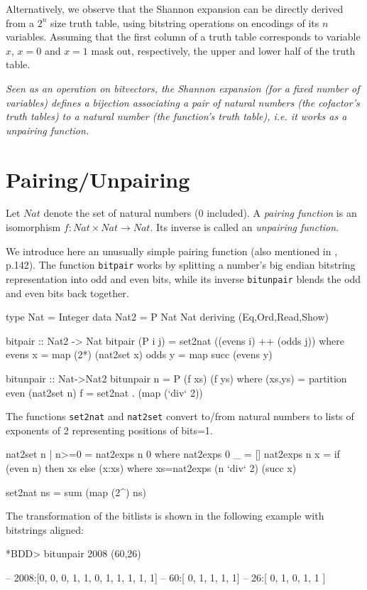 \documentclass[]{INCLUDES/llncs}
\begin{document}
Alternatively, we observe that the Shannon expansion
can be directly derived from a $2^n$ size truth table, 
using bitstring operations on encodings of its $n$ variables.
Assuming that the first column of a truth table corresponds to 
variable $x$, $x=0$ and $x=1$ mask out, respectively, 
the upper and lower half of the truth table.

{\em Seen as an operation on bitvectors, the Shannon expansion 
(for a fixed number of variables) defines a bijection associating 
a pair of natural numbers (the cofactor's truth tables) 
to a natural number (the function's truth table), 
i.e. it works as a {\em unpairing function}.}

\section{Pairing/Unpairing} \label{pairings}

Let $Nat$ denote the set of natural numbers (0 included). A {\em pairing
function} is an isomorphism $f:Nat \times Nat \rightarrow Nat$. 
Its inverse is called an {\em unpairing function}.

We introduce here an unusually simple pairing function 
(also mentioned in \cite{pigeon}, p.142).
The function {\tt bitpair} works by splitting a 
number's big endian bitstring
representation into odd and even bits, 
while its inverse {\tt bitunpair}
blends the odd and even bits back together.

\begin{code}
type Nat = Integer
data Nat2 = P Nat Nat deriving (Eq,Ord,Read,Show)

bitpair ::  Nat2 -> Nat
bitpair (P i j) = 
  set2nat ((evens i) ++ (odds j)) where
    evens x = map (2*) (nat2set x)
    odds y = map succ (evens y)

bitunpair :: Nat->Nat2  
bitunpair n = P (f xs) (f ys) where 
  (xs,ys) = partition even (nat2set n)
  f = set2nat . (map (`div` 2))
\end{code}
The functions {\tt set2nat} and {\tt nat2set} convert to/from
natural numbers to lists of exponents of 2 representing positions of
bits=1.
\begin{code}  
nat2set n | n>=0 = nat2exps n 0 where
  nat2exps 0 _ = []
  nat2exps n x = 
    if (even n) then xs else (x:xs) where
      xs=nat2exps (n `div` 2) (succ x)

set2nat ns = sum (map (2^) ns)  
\end{code}

The transformation of the bitlists
is shown in the following example 
with bitstrings aligned:
\begin{codex}
*BDD> bitunpair 2008
  (60,26)

-- 2008:[0, 0, 0, 1, 1, 0, 1, 1, 1, 1, 1]
--   60:[      0,    1,    1,    1,    1]
--   26:[   0,    1,    0,    1,    1   ]
\end{codex}
\end{document}
